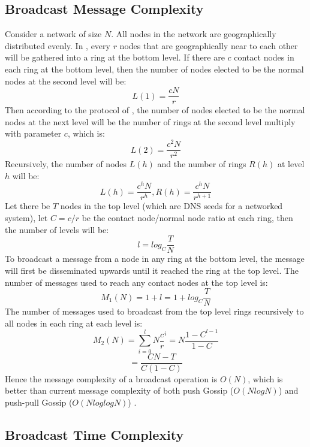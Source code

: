 \subsection{Broadcast Message Complexity}

Consider a network of size $N$. All nodes in the network are geographically distributed evenly. 
In \xxx, every $r$ nodes that are geographically near to each other will be gathered into a ring at the bottom level. 
If there are $c$ contact nodes in each ring at the bottom level, then the number of nodes elected to be the normal nodes at the second level will be: $$L(1) = \frac{cN}{r}$$ 
Then according to the protocol of \xxx, the number of nodes elected to be the normal nodes at the next level will be the number of rings at the second level multiply with parameter $c$, which is: $$L(2) = \frac{c^2N}{r^2}$$ 
Recursively, the number of nodes $L(h)$ and the number of rings $R(h)$ at level $h$ will be: $$L(h) = \frac{c^hN}{r^h}, R(h)=\frac{c^hN}{r^{h+1}}$$ 
Let there be $T$ nodes in the top level (which are DNS seeds for a networked system), let $C = c/r$ be the contact node/normal node ratio at each ring, then the number of levels will be: $$l = log_{C}{\frac{T}{N}}$$
To broadcast a message from a node in any ring at the bottom level, the message will first be disseminated upwards until it reached the ring at the top level. The number of messages used to reach any contact nodes at the top level is: $$M_1(N)=1+l=1+log_{C}{\frac{T}{N}}$$
The number of messages used to broadcast from the top level rings recursively to all nodes in each ring at each level is: $$M_2(N)=\sum_{i=0}^{l} N\frac{c}{r}^i=N\frac{1-C^{l-1}}{1-C}$$
$$=\frac{CN-T}{C(1-C)}$$ Hence the message complexity of a broadcast operation is $O(N)$, which is better than current message complexity of both push Gossip ($O(NlogN)$) and push-pull Gossip ($O(NloglogN)$) \cite{jelasity2011gossip}.

\subsection{Broadcast Time Complexity}

